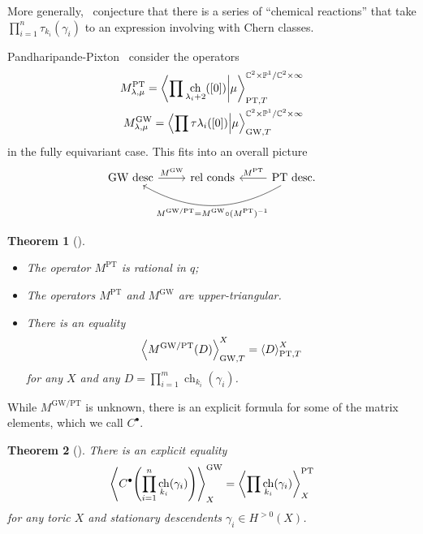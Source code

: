 \documentclass[leqno, openany]{memoir}
\newtheorem{thm}{Theorem}[section]
\theoremstyle{definition}
\theoremstyle{remark}
\theoremstyle{plain}
\theoremstyle{definition}
\theoremstyle{remark}
\newcommand{\C}{\mathbb{C}}
\renewcommand{\P}{\mathbb{P}}
\newcommand{\mr}[1]{\mathrm{#1}}
\DeclareMathOperator{\ch}{ch}
\begin{document}
More generally,~\cite{mnop2} conjecture that there is a series of ``chemical reactions'' that take
$\prod_{i=1}^n \tau_{k_i}(\gamma_i)$ to an expression involving with Chern classes.

Pandharipande-Pixton~\cite{ppgwptdesc} consider the operators
\begin{align*}
    M_{\lambda,\mu}^{\mr{PT}} = \braket{\prod \ch_{\lambda_i + 2}([0])}{\mu}_{\mr{PT},T}^{\C^2 \times \P^1 / \C^2 \times \infty} \\
    M_{\lambda,\mu}^{\mr{GW}} = \braket{\prod \tau{\lambda_i}([0])}{\mu}_{\mr{GW}, T}^{\C^2 \times \P^1 / \C^2 \times \infty}
\end{align*}
in the fully equivariant case. This fits into an overall picture
\begin{equation*}
\begin{tikzcd}
    \text{GW desc} \ar{r}{M^{\mr{GW}}} & \text{rel conds} & \text{PT desc} \ar[swap]{l}{M^{\mr{PT}}} \ar[bend left=30]{ll}{M^{\mr{GW/PT}} = M^{\mr{GW}} \circ (M^{\mr{PT}})^{-1}}.
\end{tikzcd}
\end{equation*}

\begin{thm}[\cite{ppgwptdesc}]\leavevmode
    \begin{itemize}
        \item The operator $M^{\mr{PT}}$ is rational in $q$;
        \item The operators $M^{\mr{PT}}$ and $M^{\mr{GW}}$ are upper-triangular.
        \item There is an equality
            \[ \ev{M^{\mr{GW/PT}}(D)}_{\mr{GW},T}^X = \ev{D}_{\mr{PT},T}^X \]
            for any $X$ and any $D = \prod_{i=1}^m \ch_{k_i}(\gamma_i)$.
    \end{itemize}
\end{thm}

While $M^{\mr{GW/PT}}$ is unknown, there is an explicit formula for some of the matrix elements, which we call $C^{\bullet}$.
\begin{thm}[\cite{gwptdescendent}]
    There is an explicit equality
    \[ \ev{C^{\bullet}\qty(\prod_{i=1}^n \ch_{k_i}(\gamma_i))}_X^{\mr{GW}} = \ev{\prod \ch_{k_i}(\gamma_i)}_X^{\mr{PT}} \]
    for any toric $X$ and stationary descendents $\gamma_i \in H^{>0}(X)$.
\end{thm}
\end{document}
